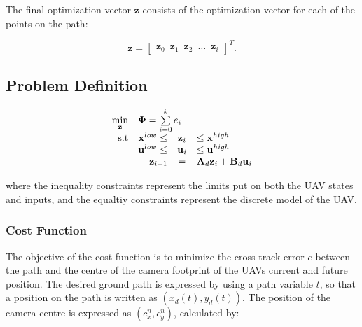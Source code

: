 The final optimization vector $\mathbf{z}$ consists of the optimization vector for each of the points on the path:

\begin{equation}
	\mathbf{z} = 
	\begin{bmatrix}
		\mathbf{z}_0 \hspace{6pt} \mathbf{z}_1 \hspace{6pt} \mathbf{z}_2 \hspace{6pt} \hdots \hspace{6pt} \mathbf{z}_i
	\end{bmatrix}^T.
\end{equation}


\subsection*{Problem Definition}

\begin{equation}
	\begin{array}{rrclcl}
		\displaystyle \min_{\mathbf{z}} & \multicolumn{3}{l}{\bm{\Phi} = \sum\limits_{i=0}^k e_i} \\
		\textrm{s.t}
		& \mathbf{x}^{low} \leq & \mathbf{z}_i & \leq \mathbf{x}^{high} \\
		& \mathbf{u}^{low} \leq & \mathbf{u}_i & \leq \mathbf{u}^{high} \\
		& \displaystyle \mathbf{z}_{i+1} & = & \mathbf{A}_d \mathbf{z}_i + \mathbf{B}_d \mathbf{u}_i
	\end{array}
\end{equation}

where the inequality constraints represent the limits put on both the UAV states and inputs, and the equaltiy constraints represent the discrete model of the UAV. %


\subsubsection*{Cost Function}

The objective of the cost function is to minimize the cross track error $e$ between the path and the centre of the camera footprint of the UAVs current and future position. The desired ground path is expressed by using a path variable $t$, so that a position on the path is written as $(x_d(t),y_d(t))$. The position of the camera centre is expressed as $(c_x^n, c_y^n)$, calculated by:

